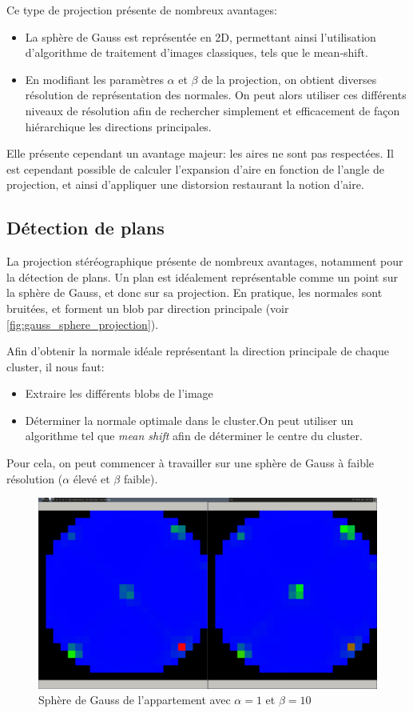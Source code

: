 \documentclass{article}
\begin{document}
Ce type de projection présente de nombreux avantages:
\begin{itemize}
\item La sphère de Gauss est représentée en 2D, permettant ainsi l'utilisation d'algorithme de traitement d'images classiques, tels que le mean-shift.
\item En modifiant les paramètres $\alpha$ et $\beta$ de la projection, on obtient diverses résolution de représentation des normales. On peut alors utiliser ces différents niveaux de résolution afin de rechercher simplement et efficacement de façon hiérarchique les directions principales.
\end{itemize}

Elle présente cependant un avantage majeur: les aires ne sont pas respectées. Il est cependant possible de calculer l'expansion d'aire en fonction de l'angle de projection, et ainsi d'appliquer une distorsion restaurant la notion d'aire.

\subsection{Détection de plans}

La projection stéréographique présente de nombreux avantages, notamment pour la détection de plans. Un plan est idéalement représentable comme un point sur la sphère de Gauss, et donc sur sa projection. En pratique, les normales sont bruitées, et forment un blob par direction principale (voir \ref{fig:gauss_sphere_projection}).

Afin d'obtenir la normale idéale représentant la direction principale de chaque cluster, il nous faut:
\begin{itemize}
\item Extraire les différents blobs de l'image
\item Déterminer la normale optimale dans le cluster.On peut utiliser un algorithme tel que \emph{mean shift} afin de déterminer le centre du cluster.
\end{itemize}

Pour cela, on peut commencer à travailler sur une sphère de Gauss à faible résolution ($\alpha$ élevé et $\beta$ faible).

\begin{figure}[H]
\centering
\includegraphics[width=\textwidth]{../2014-02-28-085518_1600x900_scrot.png}
\caption{Sphère de Gauss de l'appartement avec $\alpha=1$ et $\beta=10$}
\label{fig:sphere_gauss_low_res}
\end{figure}
\end{document}
